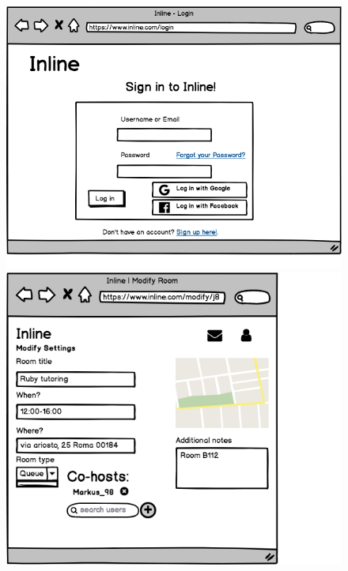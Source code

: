 	\begin{figure}[H]
		\centering
		\begin{minipage}[b]{0.45\textwidth}
			\includegraphics[width=\textwidth]{./Mockup/login.png}
		\end{minipage}
		\hfill
		\begin{minipage}[b]{0.45\textwidth}
			\includegraphics[width=\textwidth]{./Mockup/Modify.png}
		\end{minipage}
	\end{figure}

